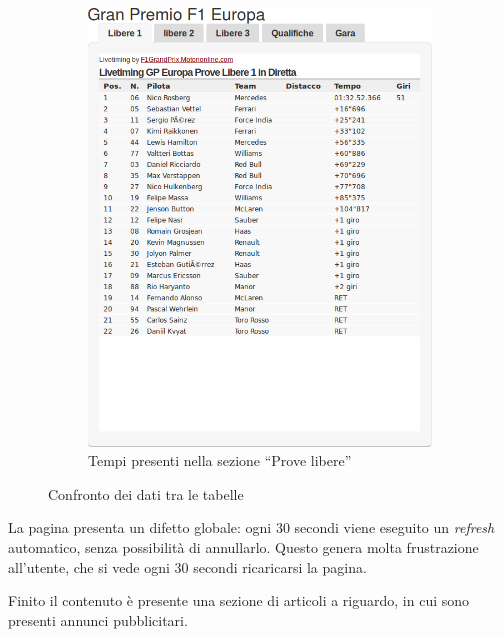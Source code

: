 \begin{figure}[H]
    ~
    \begin{subfigure}[b]{0.45\textwidth}
        \includegraphics[scale=0.25]{res/img/dettagli/tableScoreFP1}
        \caption{Tempi presenti nella sezione ``Prove libere''}
    \end{subfigure}
    \caption{Confronto dei dati tra le tabelle}
\end{figure}

La pagina presenta un difetto globale: ogni 30 secondi viene eseguito un
\textit{refresh} automatico, senza possibilità di annullarlo. Questo genera
molta frustrazione all'utente, che si vede ogni 30 secondi ricaricarsi la pagina.

Finito il contenuto è presente una sezione di articoli a riguardo, in cui sono
presenti annunci pubblicitari.
